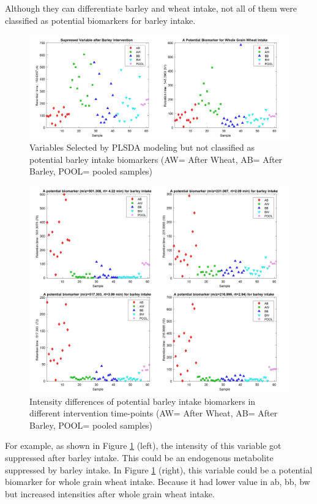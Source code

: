 Although they can differentiate barley and wheat intake, not all of them were classified as potential biomarkers for barley intake. 
\begin{figure}[h]
    \centering
    \includegraphics[scale=0.36]{images/marker1.png}
    \caption{Variables Selected by PLSDA modeling but not classified as potential barley intake biomarkers (AW= After Wheat, AB= After Barley, POOL= pooled samples)}
    \label{fig:marker1}
\end{figure}
\begin{figure}[H]
    \centering
    \includegraphics[scale=0.36]{images/barley_marker.png}
    \caption{Intensity differences of potential barley intake biomarkers in different intervention time-points (AW= After Wheat, AB= After Barley, POOL= pooled samples)}
    \label{fig:selected}
\end{figure}
\clearpage
For example, as shown in Figure \ref{fig:marker1} (left), the intensity of this variable got suppressed after barley intake. This could be an endogenous metabolite suppressed by barley intake. In Figure \ref{fig:marker1} (right), this variable could be a potential biomarker for whole grain wheat intake. Because it had lower value in \acrshort{ab}, \acrshort{bb}, \acrshort{bw} but increased intensities after whole grain wheat intake.

